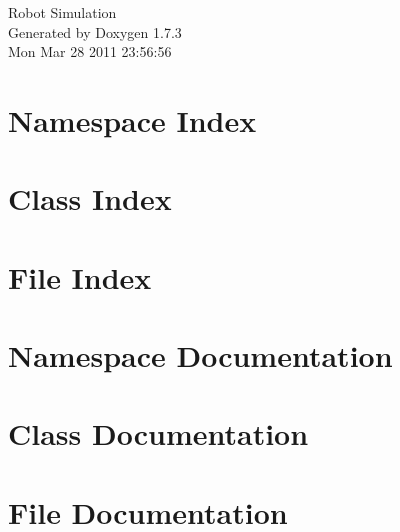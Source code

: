 \documentclass[a4paper]{book}
\begin{document}
\begin{titlepage}
\vspace*{7cm}
\begin{center}
{\Large Robot Simulation }\\
\vspace*{1cm}
{\large Generated by Doxygen 1.7.3}\\
\vspace*{0.5cm}
{\small Mon Mar 28 2011 23:56:56}\\
\end{center}
\end{titlepage}
\clearemptydoublepage
{}
\tableofcontents
\clearemptydoublepage
{}
\chapter{Namespace Index}

\chapter{Class Index}

\chapter{File Index}

\chapter{Namespace Documentation}


\chapter{Class Documentation}






\chapter{File Documentation}











\printindex
\end{document}
